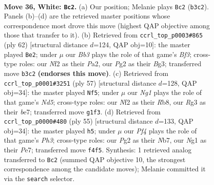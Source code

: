 \documentclass[11pt]{article}
\begin{document}
\clearpage

\begin{figure}[p]\centering
\begin{subfigure}{0.46\textwidth}\centering
\resizebox{\linewidth}{!}{%
\newchessgame
\chessboard[
  setfen={4rb2/2nkn1pr/6b1/7p/P3pP1P/1B4R1/5NP1/R2K2N1 w - - 1 36},
  showmover=false,
  pgfstyle=straightmove, color=movearrow, markmove={b3-c2}
]}
\caption{}
\end{subfigure}\hfill
\begin{subfigure}{0.46\textwidth}\centering
\resizebox{\linewidth}{!}{%
\newchessgame
\chessboard[
  setfen={4kr2/3n4/2b4p/3Np2P/p1rbP2R/3R1BB1/P2K1P2/8 w - - 4 32},
  showmover=false,
  pgfstyle=straightmove, color=movearrow, markmove={f3-e2}
]}
\caption{}
\end{subfigure}
\\[4pt]
\begin{subfigure}{0.46\textwidth}\centering
\resizebox{\linewidth}{!}{%
\newchessgame
\chessboard[
  setfen={rr5k/4Bnbp/3pp1p1/p7/2PnN3/7P/P4PP1/1R2RBK1 b - - 5 29},
  showmover=false,
  pgfstyle=straightmove, color=movearrow, markmove={d4-f5}
]}
\caption{}
\end{subfigure}\hfill
\begin{subfigure}{0.46\textwidth}\centering
\resizebox{\linewidth}{!}{%
\newchessgame
\chessboard[
  setfen={r4bk1/1n2pp2/5npp/3P4/1r6/1PN1B1PP/B1R2P2/2R3K1 b - - 0 28},
  showmover=false,
  pgfstyle=straightmove, color=movearrow, markmove={h6-h5}
]}
\caption{}
\end{subfigure}
\caption{\textbf{Move 36, White: \texttt{Bc2}.} (a) Our position; Melanie plays \texttt{Bc2} (\texttt{b3c2}). Panels (b)--(d) are the retrieved master positions whose correspondence most drove this move (highest QAP objective among those that transfer to it). (b) Retrieved from \texttt{ccrl\_top\_p0003\#865} (ply 62) [structural distance $d$=124, QAP obj=10]: the master played \texttt{Be2}; under $\mu$ our \emph{Bb3} plays the role of that game's \emph{Bf3}; cross-type roles: our \emph{N}f2 as their \emph{P}a2, our \emph{P}g2 as their \emph{B}g3; transferred move \texttt{b3c2} \textbf{(endorses this move)}. (c) Retrieved from \texttt{ccrl\_top\_p0001\#3251} (ply 57) [structural distance $d$=128, QAP obj=34]: the master played \texttt{Nf5}; under $\mu$ our \emph{Ng1} plays the role of that game's \emph{Nd5}; cross-type roles: our \emph{N}f2 as their \emph{R}b8, our \emph{R}g3 as their \emph{b}e7; transferred move \texttt{g1f3}. (d) Retrieved from \texttt{ccrl\_top\_p0000\#480} (ply 55) [structural distance $d$=133, QAP obj=34]: the master played \texttt{h5}; under $\mu$ our \emph{Pf4} plays the role of that game's \emph{Ph3}; cross-type roles: our \emph{P}g2 as their \emph{N}b7, our \emph{N}g1 as their \emph{P}e7; transferred move \texttt{f4f5}. Synthesis: 1 retrieved analog transferred to \texttt{Bc2} (summed QAP objective 10, the strongest correspondence among the candidate moves); Melanie committed it via the \texttt{search} selector.}
\label{fig:thought-m70}
\end{figure}
\end{document}
